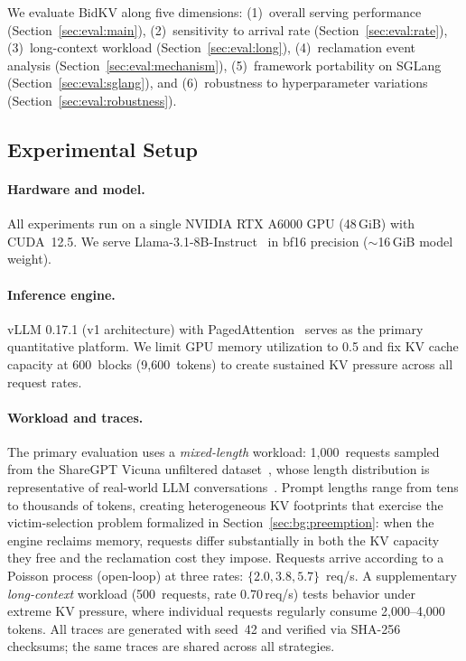 \documentclass[sigconf,nonacm]{acmart}
\newcommand{\bidkv}{BidKV\xspace}
\begin{document}
We evaluate \bidkv along five dimensions: (1)~overall serving performance
(Section~\ref{sec:eval:main}), (2)~sensitivity to arrival rate
(Section~\ref{sec:eval:rate}), (3)~long-context workload
(Section~\ref{sec:eval:long}), (4)~reclamation event analysis
(Section~\ref{sec:eval:mechanism}), (5)~framework portability on SGLang
(Section~\ref{sec:eval:sglang}), and (6)~robustness to hyperparameter variations
(Section~\ref{sec:eval:robustness}).

\subsection{Experimental Setup}\label{sec:eval:setup}

\paragraph{Hardware and model.}
All experiments run on a single NVIDIA RTX A6000 GPU (48\,GiB) with CUDA~12.5.
We serve Llama-3.1-8B-Instruct~\cite{Grattafiori2024} in bf16 precision
($\sim$16\,GiB model weight).

\paragraph{Inference engine.}
vLLM 0.17.1 (v1 architecture) with PagedAttention~\cite{Kwon2023} serves as the
primary quantitative platform.  We limit GPU memory utilization to 0.5 and fix
KV cache capacity at 600~blocks (9{,}600~tokens) to create sustained KV
pressure across all request rates.

\paragraph{Workload and traces.}
The primary evaluation uses a \emph{mixed-length} workload: 1{,}000~requests
sampled from the ShareGPT Vicuna unfiltered
dataset~\cite{ShareGPT2023}, whose length distribution is
representative of real-world LLM conversations~\cite{Zheng2024lmsys}.
Prompt lengths range from tens to thousands of tokens, creating heterogeneous
KV footprints that exercise the victim-selection problem formalized in
Section~\ref{sec:bg:preemption}: when the engine reclaims memory, requests differ
substantially in both the KV capacity they free and the reclamation cost they
impose.  Requests arrive according to a Poisson process (open-loop) at three
rates: $\{2.0, 3.8, 5.7\}$~req/s.
A supplementary \emph{long-context} workload (500~requests,
rate 0.70\,req/s) tests behavior under extreme KV pressure, where
individual requests regularly consume 2{,}000--4{,}000 tokens.
All traces are generated with seed~42 and verified via SHA-256 checksums;
the same traces are shared across all strategies.
\end{document}
